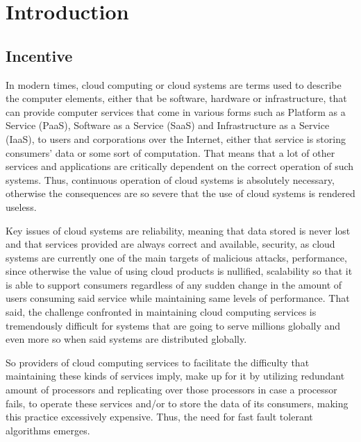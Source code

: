 \documentclass[12pt,a4paper]{report}
\begin{document}
    \setcounter{secnumdepth}{3}
    \setcounter{tocdepth}{3}
	\tableofcontents
	



	
	\chapter{Introduction}

	\setcounter{page}{1}
		\section{Incentive}
			In modern times, cloud computing or cloud systems are terms used to describe the computer elements, either that be software, hardware or 
				infrastructure, that can provide computer services that come in various forms such as Platform as a Service (PaaS), Software as a Service (SaaS)
				and Infrastructure as a Service (IaaS), to users and corporations over the Internet, either that service is storing consumers' data or some
				sort of computation. That means that a lot of other services and applications
				are critically dependent on the correct operation of such systems.
				Thus, continuous operation of cloud systems is absolutely necessary, otherwise the consequences are so severe that the use of cloud systems
				is rendered useless.

		
			Key issues of cloud systems are reliability, meaning that data stored is never lost and that services provided are always correct and
				available, security, as cloud systems are currently one of the main targets of malicious attacks, performance, since otherwise the value of
				using cloud products is nullified, scalability so that it is able to support consumers regardless of any sudden change in the amount of users
				consuming said service while maintaining same levels of performance. That said, the challenge confronted in maintaining
				cloud computing services is tremendously difficult for systems that are going to serve 
				millions globally and even more so when said systems are distributed globally.   
	
			
			So providers of cloud computing services to facilitate the difficulty that maintaining these kinds of services imply, make up for it by
			utilizing redundant amount of processors and replicating over those processors in case a processor fails, to operate	these services and/or 
			to store the data of its consumers, making this practice excessively expensive. Thus, the need for fast fault tolerant algorithms emerges.
			
\end{document}
